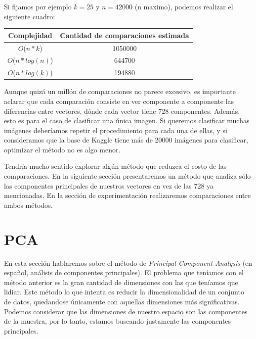Si fijamos por ejemplo $k = 25$ y $n = 42000$ (n maximo), podemos realizar el siguiente cuadro:

\begin{center}
    \begin{tabular}{| c | c |}
    \hline
    Complejidad   &  Cantidad de comparaciones estimada \\ \hline

    $O$($n * k$)            & 1050000  \\ \hline
    $O$($n * log(n)$)       & 644700  \\ \hline
    $O$($n * log(k)$)       & 194880   \\ \hline
    \end{tabular}
\end{center}

Aunque quizá un millón de comparaciones no parece excesivo, es importante aclarar que cada comparación consiste en ver componente a componente las diferencias entre vectores, dónde cada vector tiene 728 componentes. Además, esto es para el caso de clasificar una única imagen. Si queremos clasificar muchas imágenes deberíamos repetir el procedimiento para cada una de ellas, y si consideramos que la base de Kaggle tiene más de 20000 imágenes para clasificar, optimizar el método no es algo menor. \\



Tendría mucho sentido explorar algún método que reduzca el costo de las comparaciones. En la siguiente sección presentaremos un método que analiza sólo las componentes principales de nuestros vectores en vez de las 728 ya mencionadas. En la sección de experimentación realizaremos comparaciones entre ambos métodos. \\


\section{PCA}

En esta sección hablaremos sobre el método de \textit{Principal Component Analysis} (en español, análisis de componentes principales). El problema que teníamos con el método anterior es la gran cantidad de dimensiones con las que teníamos que lidiar. Este método lo que intenta es reducir la dimensionalidad de un conjunto de datos, quedandose únicamente con aquellas dimensiones más significativas. Podemos considerar que las dimensiones de nuestro espacio son las componentes de la muestra, por lo tanto, estamos buscando justamente las componentes principales. \\

